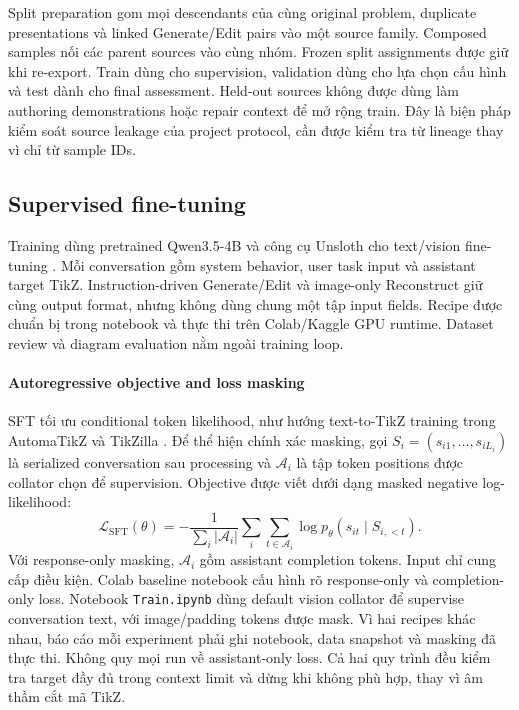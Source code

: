 \documentclass[a4paper,12pt]{article}
\begin{document}
Split preparation gom mọi descendants của cùng original problem, duplicate presentations và linked Generate/Edit pairs vào một source family. Composed samples nối các parent sources vào cùng nhóm. Frozen split assignments được giữ khi re-export. Train dùng cho supervision, validation dùng cho lựa chọn cấu hình và test dành cho final assessment. Held-out sources không được dùng làm authoring demonstrations hoặc repair context để mở rộng train. Đây là biện pháp kiểm soát source leakage của project protocol, cần được kiểm tra từ lineage thay vì chỉ từ sample IDs.

\subsection{Supervised fine-tuning}
\label{sec:fine-tuning}
Training dùng pretrained Qwen3.5-4B và công cụ Unsloth cho text/vision fine-tuning \cite{qwen35,unsloth35}. Mỗi conversation gồm system behavior, user task input và assistant target TikZ. Instruction-driven Generate/Edit và image-only Reconstruct giữ cùng output format, nhưng không dùng chung một tập input fields. Recipe được chuẩn bị trong notebook và thực thi trên Colab/Kaggle GPU runtime. Dataset review và diagram evaluation nằm ngoài training loop.

\paragraph{Autoregressive objective and loss masking}
SFT tối ưu conditional token likelihood, như hướng text-to-TikZ training trong AutomaTikZ và TikZilla \cite{automat,tikzilla}. Để thể hiện chính xác masking, gọi $S_i=(s_{i1},\ldots,s_{iL_i})$ là serialized conversation sau processing và $\mathcal A_i$ là tập token positions được collator chọn để supervision. Objective được viết dưới dạng masked negative log-likelihood:
\begin{equation}
\mathcal L_{\mathrm{SFT}}(\theta)
=-\frac{1}{\sum_i|\mathcal A_i|}
\sum_i\sum_{t\in\mathcal A_i}
\log p_\theta(s_{it}\mid S_{i,<t}).
\end{equation}
Với response-only masking, $\mathcal A_i$ gồm assistant completion tokens. Input chỉ cung cấp điều kiện. Colab baseline notebook cấu hình rõ response-only và completion-only loss. Notebook \texttt{Train.ipynb} dùng default vision collator để supervise conversation text, với image/padding tokens được mask. Vì hai recipes khác nhau, báo cáo mỗi experiment phải ghi notebook, data snapshot và masking đã thực thi. Không quy mọi run về assistant-only loss. Cả hai quy trình đều kiểm tra target đầy đủ trong context limit và dừng khi không phù hợp, thay vì âm thầm cắt mã TikZ.
\end{document}
